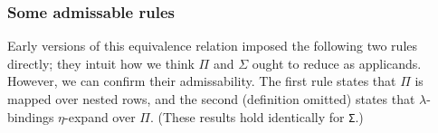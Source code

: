 \documentclass[authoryear, acmsmall, screen, review, nonacm]{acmart} %
\begin{document}
\subsubsection{Some admissable rules} Early versions of this equivalence relation imposed the following two rules directly; they intuit how we think $\Pi$ and $\Sigma$ ought to reduce as applicands. However, we can confirm their admissability. The first rule states that $\Pi$ is mapped over nested rows, and the second (definition omitted) states that $\lambda$-bindings $\eta$-expand over $\Pi$. (These results hold identically for \verb!Σ!.)

\begin{code}%
\>[0]\AgdaSpace{}%
\AgdaSymbol{:}%
\>[2625I]\AgdaSpace{}%
\AgdaSymbol{\{}\AgdaSymbol{\}}\AgdaSpace{}%
\AgdaSymbol{\{}\AgdaSpace{}%
\AgdaSymbol{:}\AgdaSpace{}%
\AgdaSpace{}%
\AgdaSpace{}%
\AgdaOperator{\AgdaInductiveConstructor{R[}}\AgdaSpace{}%
\AgdaSpace{}%
\AgdaOperator{\AgdaInductiveConstructor{]}}\AgdaSymbol{\}\{}\AgdaSpace{}%
\AgdaSymbol{:}\AgdaSpace{}%
\AgdaSpace{}%
\AgdaSymbol{(}\AgdaSpace{}%
\AgdaSymbol{)\}}\AgdaSpace{}%
\<%
\\
\>[.][@{}l@{}]\<[2625I]%
\>[8]\AgdaSymbol{(}\AgdaSpace{}%
\AgdaSymbol{\{}\AgdaSpace{}%
\AgdaSymbol{=}\AgdaSpace{}%
\AgdaSymbol{\}}\AgdaSpace{}%
\AgdaSpace{}%
\AgdaSymbol{(}\AgdaSpace{}%
\AgdaSpace{}%
\AgdaSymbol{))}\AgdaSpace{}%
\AgdaSpace{}%
\AgdaSymbol{(}\AgdaSpace{}%
\AgdaSpace{}%
\AgdaSymbol{(}\AgdaSpace{}%
\AgdaSymbol{\{}\AgdaSpace{}%
\AgdaSymbol{=}\AgdaSpace{}%
\AgdaSymbol{\}}\AgdaSpace{}%
\AgdaSpace{}%
\AgdaSymbol{))}\<%
\\
\>[0]\AgdaSpace{}%
\AgdaSymbol{=}\AgdaSpace{}%
\AgdaSpace{}%
\AgdaSpace{}%
\<%
\\
%
\\[\AgdaEmptyExtraSkip]%
\>[0]\AgdaSpace{}%

\end{code}
\end{document}
